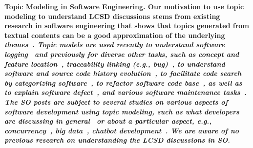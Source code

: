 \nd\bf{Topic Modeling in Software Engineering.} Our motivation to use topic modeling to understand  LCSD discussions stems from
existing research in software engineering that shows that topics generated from
textual contents can be a good approximation of the underlying
\it{themes}~\cite{Chen-SurveyTopicInSE-EMSE2016,Sun-SoftwareMaintenanceHistoryTopic-CIS2015,Sun-ExploreTopicModelSurvey-SNPD2016}.
Topic models are used recently to understand software
logging~\cite{Li-StudySoftwareLoggingUsingTopic-EMSE2018} and previously for
diverse other tasks, such as concept and feature
location~\cite{Cleary-ConceptLocationTopic-EMSE2009,Poshyvanyk-FeatureLocationTopic-TSE2007},
traceability linking (e.g.,
bug)~\cite{Rao-TraceabilityBugTopic-MSR2011,asuncion2010software},
to understand software and source code history
evolution~\cite{Hu-EvolutionDynamicTopic-SANER2015,Thomas-SoftwareEvolutionUsingTopic-SCP2014,Thomas-EvolutionSourceCodeHistoryTopic-MSR2011},
to facilitate code search by categorizing
software~\cite{Tian-SoftwareCategorizeTopic-MSR2009}, to refactor software code
base~\cite{Bavota-RefactoringTopic-TSE2014}, as well as to explain software
defect~\cite{Chen-SoftwareDefectTopic-MSR2012}, and various software maintenance
tasks~\cite{Sun-SoftwareMaintenanceTopic-IST2015,Sun-SoftwareMaintenanceHistoryTopic-CIS2015}.
The SO posts are subject to several studies on various aspects
of software development using topic modeling, such as what developers are
discussing in general~\cite{barua2014developers} or about a
particular aspect, e.g., concurrency~\cite{ahmed2018concurrency}, big
data~\cite{bagherzadeh2019going}, chatbot development~\cite{abdellatif2020challenges}.
We are aware of no previous research on understanding
the  LCSD discussions in SO.
% 
% 
